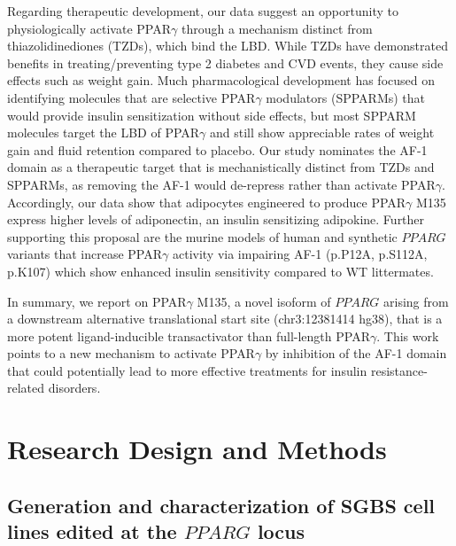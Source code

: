 Regarding therapeutic development, our data suggest an opportunity to physiologically activate PPAR$\gamma$ through a mechanism distinct from thiazolidinediones (TZDs), which bind the LBD. While TZDs have demonstrated benefits in treating/preventing type 2 diabetes and CVD events\cite{Lebovitz2019-oe,dreamteam2006-hz}, they cause side effects such as weight gain\cite{Yki-Jarvinen2004-ba}. Much pharmacological development has focused on identifying molecules that are selective PPAR$\gamma$ modulators (SPPARMs) that would provide insulin sensitization without side effects, but most SPPARM molecules target the LBD of PPAR$\gamma$\cite{Higgins2010-tv} and still show appreciable rates of weight gain and fluid retention compared to placebo\cite{DePaoli2014-hi}. Our study nominates the AF-1 domain as a therapeutic target that is mechanistically distinct from TZDs and SPPARMs, as removing the AF-1 would de-repress rather than activate PPAR$\gamma$. Accordingly, our data show that adipocytes engineered to produce PPAR$\gamma$ M135 express higher levels of adiponectin, an insulin sensitizing adipokine\cite{Berg2001-oq,Stern2016-kw}. Further supporting this proposal are the murine models of human and synthetic \(PPARG\) variants that increase PPAR$\gamma$ activity via impairing AF-1 (p.P12A\cite{Heikkinen2009-vb}, p.S112A\cite{Rangwala2003-hm}, p.K107\cite{Katafuchi2018-jw}) which show enhanced insulin sensitivity compared to WT littermates.

In summary, we report on PPAR$\gamma$ M135, a novel isoform of \(PPARG\) arising from a downstream alternative translational start site (chr3:12381414 hg38), that is a more potent ligand-inducible transactivator than full-length PPAR$\gamma$. This work points to a new mechanism to activate PPAR$\gamma$ by inhibition of the AF-1 domain that could potentially lead to more effective treatments for insulin resistance-related disorders.

\section{Research Design and Methods}

\subsection{Generation and characterization of SGBS cell lines edited at the \texorpdfstring{\(PPARG\)}{PPARG} locus}

